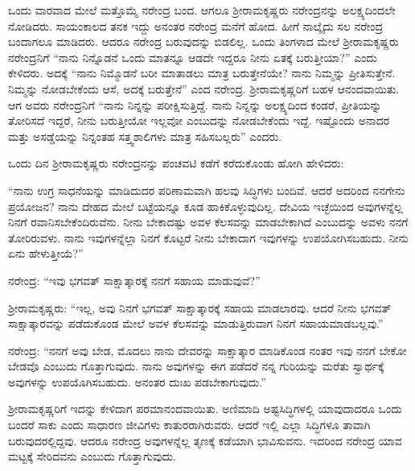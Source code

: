 ಒಂದು ವಾರವಾದ ಮೇಲೆ ಮತ್ತೊಮ್ಮೆ ನರೇಂದ್ರ ಬಂದ. ಆಗಲೂ ಶ‍್ರೀರಾಮಕೃಷ್ಣರು ನರೇಂದ್ರನನ್ನು ಅಲಕ್ಷ್ಯದಿಂದಲೇ ನೋಡಿದರು. ಸಾಯಂಕಾಲದ ತನಕ ಇದ್ದು ಅನಂತರ ನರೇಂದ್ರ ಮನೆಗೆ ಹೋದ. ಹೀಗೆ ನಾಲ್ಕೈದು ಸಲ ನರೇಂದ್ರ ಬಂದಾಗಲೂ ಮಾಡಿದರು. ಆದರೂ ನರೇಂದ್ರ ಬರುವುದನ್ನು ಬಿಡಲಿಲ್ಲ. ಒಂದು ತಿಂಗಳಾದ ಮೇಲೆ ಶ‍್ರೀರಾಮಕೃಷ್ಣರು ನರೇಂದ್ರನಿಗೆ “ನಾನು ನಿನ್ನೊಡನೆ ಒಂದು ಮಾತನ್ನೂ ಆಡದೇ ಇದ್ದರೂ ನೀನು ಏತಕ್ಕೆ ಬರುತ್ತೀಯಾ?” ಎಂದು ಕೇಳಿದರು. ಅದಕ್ಕೆ “ನಾನು ನಿಮ್ಮೊಡನೆ ಬರೀ ಮಾತಾಡಲು ಮಾತ್ರ ಬರುತ್ತೇನೆಯೇ? ನಾನು ನಿಮ್ಮನ್ನು ಪ್ರೀತಿಸುತ್ತೇನೆ. ನಿಮ್ಮನ್ನು ನೋಡಬೇಕೆಂದು ಆಸೆ, ಅದಕ್ಕೆ ಬರುತ್ತೇನೆ” ಎಂದ ನರೇಂದ್ರ. ಶ‍್ರೀರಾಮಕೃಷ್ಣರಿಗೆ ಬಹಳ ಆನಂದವಾಯಿತು. ಆಗ ಅವರು ನರೇಂದ್ರನಿಗೆ “ನಾನು ನಿನ್ನನ್ನು ಪರೀಕ್ಷಿಸುತ್ತಿದ್ದೆ. ನಾನು ನಿನ್ನನ್ನು ಅಲಕ್ಷ್ಯದಿಂದ ಕಂಡರೆ, ಪ್ರೀತಿಯನ್ನು ತೋರಿಸದೆ ಇದ್ದರೆ, ನೀನು ಬರುತ್ತೀಯೋ ಇಲ್ಲವೋ ಎಂಬುದನ್ನು ನೋಡಬೇಕೆಂದು ಇದ್ದೆ. ಇಷ್ಟೊಂದು ಅನಾದರ ಮತ್ತು ಅಸಡ್ಡೆಯನ್ನು ನಿನ್ನಂತಹ ಸತ್ತ್ವಶಾಲಿಗಳು ಮಾತ್ರ ಸಹಿಸಬಲ್ಲರು” ಎಂದರು.

ಒಂದು ದಿನ ಶ‍್ರೀರಾಮಕೃಷ್ಣರು ನರೇಂದ್ರನನ್ನು ಪಂಚವಟಿ ಕಡೆಗೆ ಕರೆದುಕೊಂಡು ಹೋಗಿ ಹೇಳಿದರು:

“ನಾನು ಉಗ್ರ ಸಾಧನೆಯನ್ನು ಮಾಡಿದುದರ ಪರಿಣಾಮವಾಗಿ ಹಲವು ಸಿದ್ಧಿಗಳು ಬಂದಿವೆ. ಆದರೆ ಅದರಿಂದ ನನಗೇನು ಪ್ರಯೋಜನ? ನಾನು ದೇಹದ ಮೇಲೆ ಬಟ್ಟೆಯನ್ನೂ ಕೂಡ ಹಾಕಿಕೊಳ್ಳುವುದಿಲ್ಲ. ದೇವಿಯ ಇಚ್ಛೆಯಿಂದ ಅವುಗಳನ್ನೆಲ್ಲ ನಿನಗೆ ರವಾನಿಸಬೇಕೆಂದಿರುವೆನು. ನೀನು ಬೇಕಾದಷ್ಟು ಅವಳ ಕೆಲಸವನ್ನು ಮಾಡಬೇಕಾಗಿದೆ ಎಂಬುದನ್ನು ಅವಳು ನನಗೆ ತೋರಿರುವಳು. ನಾನು ಇವುಗಳನ್ನೆಲ್ಲಾ ನಿನಗೆ ಕೊಟ್ಟರೆ ನೀನು ಬೇಕಾದಾಗ ಇವುಗಳನ್ನು ಉಪಯೋಗಿಸಬಹುದು. ನೀನು ಏನು ಹೇಳುತ್ತೀಯೆ?”

ನರೇಂದ್ರ: “ಇವು ಭಗವತ್ ಸಾಕ್ಷಾತ್ಕಾರಕ್ಕೆ ನನಗೆ ಸಹಾಯ ಮಾಡುವುವೆ?”

ಶ‍್ರೀರಾಮಕೃಷ್ಣರು: “ಇಲ್ಲ, ಅವು ನಿನಗೆ ಭಗವತ್ ಸಾಕ್ಷಾತ್ಕಾರಕ್ಕೆ ಸಹಾಯ ಮಾಡಲಾರವು. ಆದರೆ ನೀನು ಭಗವತ್ ಸಾಕ್ಷಾತ್ಕಾರವನ್ನು ಪಡೆದುಕೊಂಡ ಮೇಲೆ ಅವಳ ಕೆಲಸವನ್ನು ಮಾಡುತ್ತಿರುವಾಗ ನಿನಗೆ ಸಹಾಯಮಾಡಬಲ್ಲವು.”

ನರೇಂದ್ರ: “ನನಗೆ ಅವು ಬೇಡ, ಮೊದಲು ನಾನು ದೇವರನ್ನು ಸಾಕ್ಷಾತ್ಕಾರ ಮಾಡಿಕೊಂಡ ನಂತರ ಇವು ನನಗೆ ಬೇಕೋ ಬೇಡವೊ ಎಂಬುದು ಗೊತ್ತಾಗುವುದು. ನಾನು ಅವುಗಳನ್ನು ಈಗ ಪಡೆದರೆ ನನ್ನ ಗುರಿಯನ್ನು ಮರೆತು ಸ್ವಾರ್ಥಕ್ಕೆ ಅವುಗಳನ್ನು ಉಪಯೊಗಿಸಬಹುದು. ಅನಂತರ ದುಃಖ ಪಡಬೇಕಾಗುವುದು.”

ಶ‍್ರೀರಾಮಕೃಷ್ಣರಿಗೆ ಇದನ್ನು ಕೇಳಿದಾಗ ಪರಮಾನಂದವಾಯಿತು. ಅಣಿಮಾದಿ ಅಷ್ಟಸಿದ್ಧಿಗಳಲ್ಲಿ ಯಾವುದಾದರೂ ಒಂದು ಬಂದರೆ ಸಾಕು ಎಂದು ಸಾಧಾರಣ ಜೀವಿಗಳು ಕಾತುರರಾಗಿರುವರು. ಆದರೆ ಇಲ್ಲಿ ಎಲ್ಲಾ ಸಿದ್ಧಿಗಳೂ ತಾವಾಗಿ ಬರುವುದರಲ್ಲಿದ್ದವು. ಆದರೂ ನರೇಂದ್ರ ಅವುಗಳನ್ನೆಲ್ಲ ತೃಣಕ್ಕೆ ಕಡೆಯಾಗಿ ಭಾವಿಸುವನು. ಇದರಿಂದ ನರೇಂದ್ರ ಯಾವ ಮಟ್ಟಕ್ಕೆ ಸೇರಿದವನು ಎಂಬುದು ಗೊತ್ತಾಗುವುದು.


